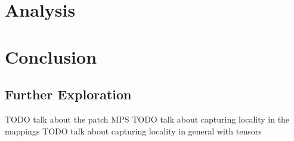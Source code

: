 \documentclass{article}
\theoremstyle{definition}
\theoremstyle{definition}
\begin{document}
\section{Analysis}



\section{Conclusion}



\subsection{Further Exploration}
TODO talk about the patch MPS
TODO talk about capturing locality in the mappings
TODO talk about capturing locality in general with tensors

\printbibliography
\end{document}
